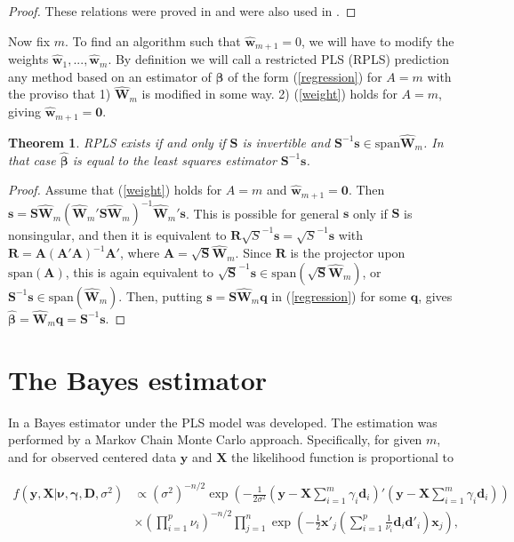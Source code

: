 \documentclass[a4paper, 11pt]{article}
\newtheorem{theorem}{Theorem} \newtheorem{principle}{Principle}
\begin{document}
\begin{proof}
These relations were proved in \citet{helland1988structure} and were also used in \citet{cook2013envelopes}.
\end{proof}

Now fix $m$. To find an algorithm such that $\widehat{\bm{w}}_{m+1}=0$, we will have to modify the weights $\widehat{\bm{w}}_1,...,\widehat{\bm{w}}_m$. By definition we will call a restricted PLS (RPLS) prediction any method based on an estimator of $\bm{\beta}$ of the form (\ref{regression}) for $A=m$ with the proviso that 1) $\widehat{\bm{W}}_{m}$ is modified in some way.  2) (\ref{weight}) holds for $A=m$, giving $\widehat{\bm{w}}_{m+1}=\bm{0}$.

\begin{theorem}
RPLS exists if and only if $\bm{S}$ is invertible and $\bm{S}^{-1}\bm{s}\in\mathrm{span}\widehat{\bm{W}}_{m}$. In that case $\widehat{\bm{\beta}}$ is equal to the least squares estimator $\bm{S}^{-1}\bm{s}$.
\end{theorem}

\begin{proof}
Assume that (\ref{weight}) holds for $A=m$ and $\widehat{\bm{w}}_{m+1}=\bm{0}$. Then $\bm{s}=\bm{S}\widehat{\bm{W}}_m(\widehat{\bm{W}}_m'\bm{S}\widehat{\bm{W}}_m)^{-1}\widehat{\bm{W}}_m'\bm{s}$. This is possible for general $\bm{s}$ only if $\bm{S}$ is nonsingular, and then it is equivalent to $\bm{R}\sqrt{S}^{-1}\bm{s}=\sqrt{S}^{-1}\bm{s}$ with $\bm{R}=\bm{A}(\bm{A}'\bm{A})^{-1}\bm{A}'$, where $\bm{A}=\sqrt{\bm{S}}\widehat{\bm{W}}_m$. Since $\bm{R}$ is the projector upon $\mathrm{span}(\bm{A})$, this is again equivalent to $\sqrt{\bm{S}}^{-1}\bm{s}\in\mathrm{span}(\sqrt{\bm{S}}\widehat{\bm{W}}_m)$, or $\bm{S}^{-1}\bm{s}\in\mathrm{span}(\widehat{\bm{W}}_m)$. Then, putting $\bm{s}=\bm{S}\widehat{\bm{W}}_m\bm{q}$ in (\ref{regression}) for some $\bm{q}$, gives $\widehat{\bm{\beta}}=\widehat{\bm{W}}_m\bm{q}=\bm{S}^{-1}\bm{s}$.
\end{proof}

\section{The Bayes estimator}
In \citet{helland2012near} a Bayes estimator under the PLS model was developed. The estimation was performed by a Markov Chain Monte Carlo approach. Specifically, for given $m$, and for observed centered data $\bm{y}$ and $\bm{X}$ the likelihood function is proportional to

\begin{equation}
  \label{likelihood}
  \begin{split}
    f(\bm{y},\bm{X}|\bm{\nu}, \bm{\gamma}, \bm{D},\sigma^2) &\propto (\sigma^2)^{-n/2}
    \exp\left(-\frac{1}{2\sigma^2}(\bm{y}-\bm{X}\sum_{i=1}^{m}\gamma_i \bm{d}_i)'(\bm{y}-\bm{X}\sum_{i=1}^{m}\gamma_i \bm{d}_i)\right)\\
    &\times (\prod_{i=1}^{p}\nu_i)^{-n/2}\prod_{j=1}^{n}\exp\left(-\frac{1}{2} \bm{x}'_j(\sum_{i=1}^{p}\frac{1}{\nu_i}\bm{d}_i \bm{d}'_i)\bm{x}_j  \right),
  \end{split}
\end{equation}
\end{document}
